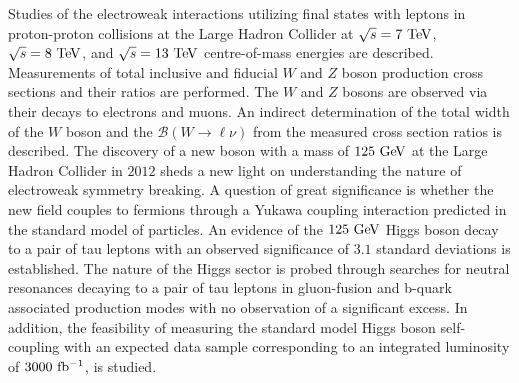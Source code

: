 % 
% 
%

Studies of the electroweak interactions utilizing final states with leptons in proton-proton collisions at the Large Hadron Collider at $\sqrt{s}=7~\mathrm{Te\kern -0.1em V}$, $\sqrt{s}=8~\mathrm{Te\kern -0.1em V}$, and $\sqrt{s}=13~\mathrm{Te\kern -0.1em V}$ centre-of-mass energies are described. Measurements of total inclusive and fiducial $W$ and $Z$ boson production cross sections and their ratios are performed. The $W$ and $Z$ bosons are observed via their decays to electrons and muons. An indirect determination of the total width of the $W$ boson and the $\mathcal{B}(W\rightarrow\ell\nu)$ from the measured cross section ratios is described. The discovery of a new boson with a mass of $125~\mathrm{Ge\kern -0.1em V}$ at the Large Hadron Collider in $2012$ sheds a new light on understanding the nature of electroweak symmetry breaking. A question of great significance is whether the new field couples to fermions through a Yukawa coupling interaction predicted in the standard model of particles. An evidence of the $125~\mathrm{Ge\kern -0.1em V}$ Higgs boson decay to a pair of tau leptons with an observed significance of $3.1$ standard deviations is established. The nature of the Higgs sector is probed through searches for neutral resonances decaying to a pair of tau leptons in gluon-fusion and b-quark associated production modes with no observation of a significant excess. In addition, the feasibility of measuring the standard model Higgs boson self-coupling with an expected data sample corresponding to an integrated luminosity of $3000~\mathrm{fb^{-1}}$, is studied.
